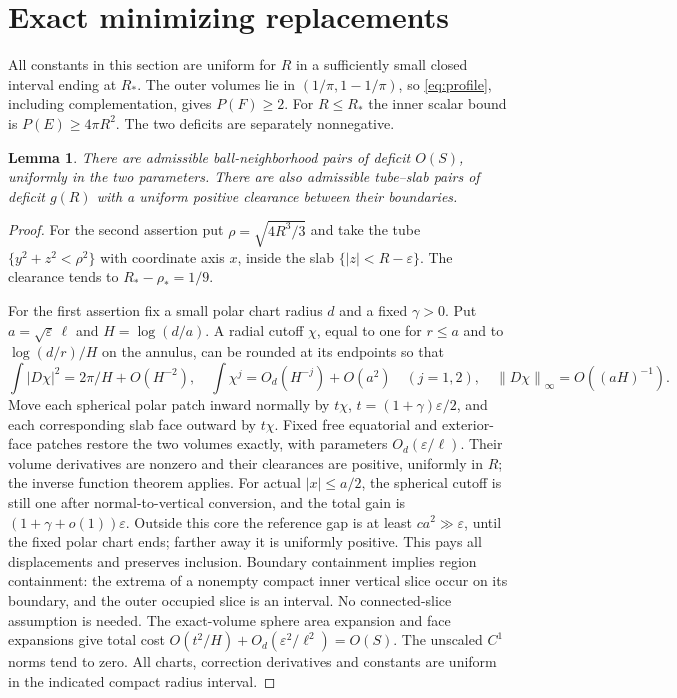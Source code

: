 \documentclass[11pt]{article}
\newcommand{\eps}{\varepsilon}
\newcommand{\norm}[1]{\left\|#1\right\|}
\newtheorem{lemma}[theorem]{Lemma}
\theoremstyle{remark}\newtheorem{remark}[theorem]{Remark}
\numberwithin{equation}{section}
\begin{document}
\section{Exact minimizing replacements}\label{sec:replacement}
All constants in this section are uniform for $R$ in a sufficiently small
closed interval ending at $R_*$. The outer volumes lie in
$(1/\pi,1-1/\pi)$, so \eqref{eq:profile}, including complementation,
gives $P(F)\geq2$. For $R\leq R_*$ the inner scalar bound is
$P(E)\geq4\pi R^2$. The two deficits are separately nonnegative.

\begin{lemma}\label{lem:upper-rough}
There are admissible ball-neighborhood pairs of deficit $O(S)$, uniformly
in the two parameters. There are also admissible tube--slab pairs of
deficit $g(R)$ with a uniform positive clearance between their boundaries.
\end{lemma}
\begin{proof}
For the second assertion put $\rho=\sqrt{4R^3/3}$ and take the tube
$\{y^2+z^2<\rho^2\}$ with coordinate axis $x$, inside the slab
$\{|z|<R-\eps\}$. The clearance tends to $R_*-\rho_*=1/9$.

For the first assertion fix a small polar chart radius $d$ and a fixed
$\gamma>0$. Put $a=\sqrt\eps\,\ell$ and
$H=\log(d/a)$. A radial cutoff $\chi$, equal to one for $r\leq a$
and to $\log(d/r)/H$ on the annulus, can be rounded at its endpoints so that
\[
 \int|D\chi|^2=2\pi/H+O(H^{-2}),\quad
 \int\chi^j=O_d(H^{-j})+O(a^2)\quad(j=1,2),
 \quad\norm{D\chi}_\infty=O((aH)^{-1}).
\]
Move each spherical polar patch inward normally by
$t\chi$, $t=(1+\gamma)\eps/2$, and each corresponding slab face
outward by $t\chi$. Fixed free equatorial and exterior-face patches
restore the two volumes exactly, with parameters $O_d(\eps/\ell)$.
Their volume derivatives are nonzero and their clearances are positive,
uniformly in $R$; the inverse function theorem applies.
For actual $|x|\leq a/2$, the spherical cutoff is still one after
normal-to-vertical conversion, and the total gain is
$(1+\gamma+o(1))\eps$. Outside this core the reference gap is at least
$ca^2\gg\eps$, until the fixed polar chart ends; farther away it is
uniformly positive. This pays all displacements and preserves inclusion.
Boundary containment implies region containment: the extrema of a
nonempty compact inner vertical slice occur on its boundary, and the
outer occupied slice is an interval. No connected-slice assumption is
needed. The exact-volume sphere area expansion and face expansions give
total cost $O(t^2/H)+O_d(\eps^2/\ell^2)=O(S)$. The unscaled
$C^1$ norms tend to zero. All charts, correction derivatives and constants
are uniform in the indicated compact radius interval.
\end{proof}
\end{document}
